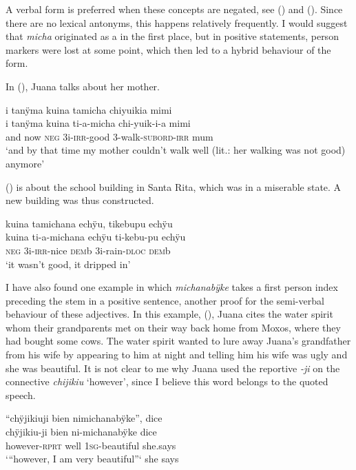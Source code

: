 A verbal form is preferred when these concepts are negated, see () and (). Since there are no lexical antonyms, this happens relatively frequently. I would suggest that \textit{micha} originated as a  in the first place, but in positive statements, person markers were lost at some point, which then led to a hybrid behaviour of the form.

In (), Juana talks about her mother.

\ea\label{ex:ADJ-micha-IRR-1}
\begingl
\glpreamble i tanÿma kuina tamicha chiyuikia mimi\\
\gla i tanÿma kuina ti-a-micha chi-yuik-i-a mimi\\
\glb and now \textsc{neg} 3i-\textsc{irr}-good 3-walk-\textsc{subord}-\textsc{irr} mum\\
\glft ‘and by that time my mother couldn’t walk well (lit.: her walking was not good) anymore’
\endgl
\trailingcitation{[jxx-p120430l-2.499]}
\xe

() is about the school building in Santa Rita, which was in a miserable state. A new building was thus constructed.

\ea\label{ex:michana-2}
\begingl 
\glpreamble kuina tamichana echÿu, tikebupu echÿu\\
\gla kuina ti-a-michana echÿu ti-kebu-pu echÿu\\ 
\glb \textsc{neg} 3i-\textsc{irr}-nice \textsc{dem}b 3i-rain-\textsc{dloc} \textsc{dem}b\\ 
\glft ‘it wasn’t good, it dripped in’\\ 
\endgl
\trailingcitation{[mxx-p110825l.089]}
\xe
{}

I have also found one example in which \textit{michanabÿke} takes a first person index preceding the stem in a positive sentence, another proof for the semi-verbal behaviour of these adjectives. In this example, (), Juana cites the water spirit whom their grandparents met on their way back home from Moxos, where they had bought some cows. The water spirit wanted to lure away Juana’s grandfather from his wife by appearing to him at night and telling him his wife was ugly and she was beautiful. It is not clear to me why Juana used the reportive \textit{-ji} on the connective \textit{chijikiu} ‘however’, since I believe this word belongs to the quoted speech.

\ea\label{ex:pretty-2}
\begingl
\glpreamble “chÿjikiuji bien nimichanabÿke”, dice\\
\gla chÿjikiu-ji bien ni-michanabÿke dice\\
\glb however-\textsc{rprt} well 1\textsc{sg}-beautiful she.says\\
\glft ‘“however, I am very beautiful”‘ she says
\endgl
\trailingcitation{[jxx-p151016l-2.190]}
\xe

